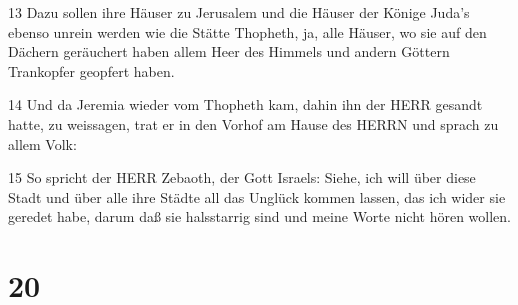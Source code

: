 \par 13 Dazu sollen ihre Häuser zu Jerusalem und die Häuser der Könige Juda's ebenso unrein werden wie die Stätte Thopheth, ja, alle Häuser, wo sie auf den Dächern geräuchert haben allem Heer des Himmels und andern Göttern Trankopfer geopfert haben.
\par 14 Und da Jeremia wieder vom Thopheth kam, dahin ihn der HERR gesandt hatte, zu weissagen, trat er in den Vorhof am Hause des HERRN und sprach zu allem Volk:
\par 15 So spricht der HERR Zebaoth, der Gott Israels: Siehe, ich will über diese Stadt und über alle ihre Städte all das Unglück kommen lassen, das ich wider sie geredet habe, darum daß sie halsstarrig sind und meine Worte nicht hören wollen.

\chapter{20}

